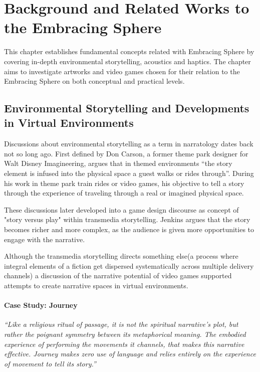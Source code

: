 \chapter{Background and Related Works to the Embracing Sphere}
    This chapter establishes fundamental concepts related with Embracing Sphere by covering in-depth environmental storytelling, acoustics and haptics. The chapter aims to investigate artworks and video games chosen for their relation to the Embracing Sphere on both conceptual and practical levels.\par
    \section{Environmental Storytelling and Developments in Virtual Environments}
        Discussions about environmental storytelling as a term in narratology dates back not so long ago. First defined by Don Carson, a former theme park designer for Walt Disney Imagineering, argues that in themed environments “the story element is infused into the physical space a guest walks or rides through”\cite{Liminal_Space_Between_Embedded_and_Emergent_Narrative}. During his work in theme park train rides or video games, his objective to tell a story through the experience of traveling through a real or imagined physical space\cite{Lessons_Learned_from_the_Theme_Park_Industry}.\par

        These discussions later developed into a game design discourse as concept of "story versus play" within transmedia storytelling\cite{Jenkins_Shall_We_Play}. Jenkins argues that the story becomes richer and more complex, as the audience is given more opportunities to engage with the narrative.\par

        Although the transmedia storytelling directs something else(a process where integral elements of a fiction get dispersed systematically across multiple delivery channels\cite{Jenkins_Transmedia}) a discussion of the narrative potential of video games supported attempts to create narrative spaces in virtual environments\cite{Liminal_Space_Between_Embedded_and_Emergent_Narrative}.\par

        \subsubsection{Case Study: Journey}
            \emph{“Like a religious ritual of passage, it is not the spiritual narrative’s plot, but rather the poignant symmetry between its metaphorical meaning. The embodied experience of performing the movements it channels, that makes this narrative effective. Journey makes zero use of language and relies entirely on the experience of movement to tell its story\cite{Game_Movement_as_Enactive_Focalization}\cite{Narrative_Geography}.”}\par

